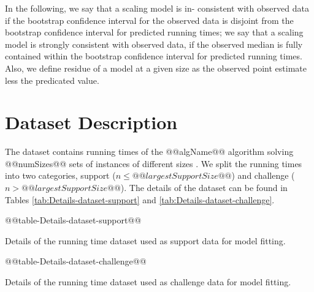 In the following, we say that a scaling model is in-
consistent with observed data if the bootstrap confidence interval for the observed data
is disjoint from the bootstrap confidence interval for
predicted running times; 
we say that a scaling model is strongly consistent with observed
data, if the observed median is fully contained
within the bootstrap confidence interval for predicted
running times.
Also, we define residue of a model at a given size as the observed 
point estimate less the predicated value.

\section{Dataset Description}

The dataset contains running times of the @@algName@@ algorithm solving
@@numSizes@@ sets of instances of different sizes . We split the running times into
two categories, support ($n\leq@@largestSupportSize@@$) and challenge ($n>@@largestSupportSize@@$). The
details of the dataset can be found in Tables \ref{tab:Details-dataset-support} 
and \ref{tab:Details-dataset-challenge}.
\begin{table*}
\noindent \begin{centering}
@@table-Details-dataset-support@@
\par\end{centering}

\caption{\label{tab:Details-dataset-support} Details of the running time dataset used as support data for model fitting. }
\end{table*}

\begin{table*}
\noindent \begin{centering}
@@table-Details-dataset-challenge@@
\par\end{centering}

\caption{\label{tab:Details-dataset-challenge} Details of the running time dataset used as challenge data for model fitting. }
\end{table*}

